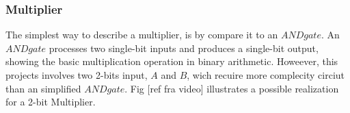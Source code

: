 \subsubsection{Multiplier}
The simplest way to describe a multiplier, is by compare it to an $AND  gate$. An $AND gate$ processes two single-bit inputs and produces a single-bit output, showing the basic multiplication operation in binary arithmetic. Howeever, this projects involves two 2-bits input, $A$ and $B$, wich recuire more complecity circiut than an simplified $AND gate$. Fig [ref fra video] illustrates a possible realization for a 2-bit Multiplier.
